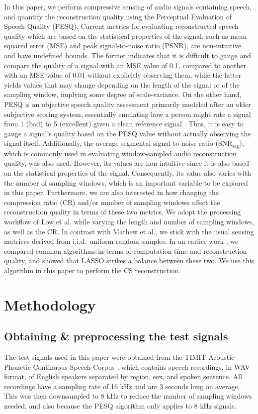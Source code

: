 \documentclass[10pt,a4paper,twoside]{article}
\newcommand{\snrseg}{SNR$_{\mathrm{seg}}$}
\begin{document}
In this paper, we perform compressive sensing of audio signals containing speech, and quantify the reconstruction quality using the Perceptual Evaluation of Speech Quality (PESQ). Current metrics for evaluating reconstructed speech quality which are based on the statistical properties of the signal, such as mean-squared error (MSE) and peak signal-to-noise ratio (PSNR), are non-intuitive and have undefined bounds. The former indicates that it is difficult to gauge and compare the quality of a signal with an MSE value of 0.1, compared to another with an MSE value of 0.01 without explicitly observing them, while the latter yields values that may change depending on the length of the signal or of the sampling window, implying some degree of scale-variance. On the other hand, PESQ is an objective speech quality assessment primarily modeled after an older subjective scoring system, essentially emulating how a person might rate a signal from 1 (bad) to 5 (excellent) given a clean reference signal \cite{pesq}. Thus, it is easy to gauge a signal's quality based on the PESQ value without actually observing the signal itself. Additionally, the average segmental signal-to-noise ratio (\snrseg), which is commonly used in evaluating window-sampled audio reconstruction quality, was also used. However, its values are non-intuitive since it is also based on the statistical properties of the signal. Consequently, its value also varies with the number of sampling windows, which is an important variable to be explored in this paper. Furthermore, we are also interested in how changing the compression ratio (CR) and/or number of sampling windows affect the reconstruction quality in terms of these two metrics. We adopt the processing workflow of Low et al. while varying the length and number of sampling windows, as well as the CR. In contrast with Mathew et al., we stick with the usual sensing matrices derived from i.i.d.~uniform random samples. In an earlier work \cite{Domingo2019}, we compared common algorithms in terms of computation time and reconstruction quality, and showed that LASSO strikes a balance between these two. We use this algorithm in this paper to perform the CS reconstruction.


\section{Methodology}\label{sec:metho}

\subsection{Obtaining \& preprocessing the test signals}\label{ssec:timit}
The test signals used in this paper were obtained from the TIMIT Acoustic-Phonetic Continuous Speech Corpus \cite{timit}, which contains speech recordings, in WAV format, of English speakers separated by region, sex, and spoken sentence. All recordings have a sampling rate of 16 kHz and are 3 seconds long on average. This was then downsampled to 8 kHz to reduce the number of sampling windows needed, and also because the PESQ algorithm only applies to 8 kHz signals.
\end{document}
